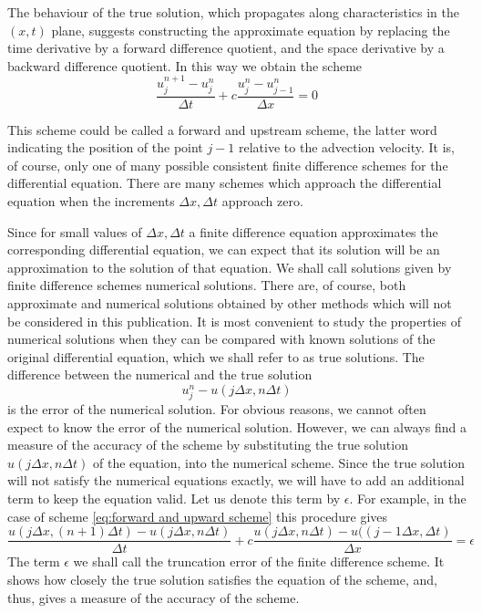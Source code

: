 The behaviour of the true solution, which propagates along characteristics in the $(x,t)$ plane, suggests constructing the approximate equation by replacing the time derivative by a forward difference quotient, and the space derivative by a backward difference quotient. In this way we obtain the scheme
\begin{equation}\label{eq:forward and upward scheme}
    \frac{u_j^{n+1}-u_j^n}{\Delta t}+c\frac{u_j^n-u^n_{j-1}}{\Delta x}=0
\end{equation}

This scheme could be called a forward and upstream scheme, the latter word indicating the position of the point $j-1$ relative to the advection velocity. It is, of course, only one of many possible consistent finite difference schemes for the differential equation. There are many schemes which approach the differential equation when the increments $\Delta x,\Delta t$ approach zero.

Since for small values of $\Delta x, \Delta t$ a finite difference equation approximates the corresponding differential equation, we can expect that its solution will be an approximation to the solution of that equation. We shall call solutions given by finite difference schemes numerical solutions. There are, of course, both approximate and numerical solutions obtained by other methods which will not be considered in this publication. It is most convenient to study the properties of numerical solutions when they can be compared with known solutions of the original differential equation, which we shall refer to as true solutions. The difference between the numerical and the true solution
 \begin{equation}
     u_j^n-u(j\Delta x,n\Delta t)
 \end{equation}
 is the error of the numerical solution. For obvious reasons, we cannot often expect to know the error of the numerical solution. However, we can always find a measure of the accuracy of the scheme by substituting the true solution $u(j\Delta x, n\Delta t)$ of the equation, into the numerical scheme. Since the true solution will not satisfy the numerical equations exactly, we will have to add an additional term to keep the equation valid. Let us denote this term by $\epsilon$. For example, in the case of scheme \ref{eq:forward and upward scheme} this procedure gives
 \begin{equation}\label{eq:2.4.7}
     \frac{u(j\Delta x,(n+1)\Delta t)-u(j\Delta x, n\Delta t)}{\Delta t}+c\frac{u(j\Delta x, n\Delta t)-u((j-1\Delta x, \Delta t)}{\Delta x}=\epsilon
 \end{equation}
The term $\epsilon$ we shall call the truncation error of the finite difference scheme. It shows how closely the true solution satisfies the equation of the scheme, and, thus, gives a measure of the accuracy of the scheme.

